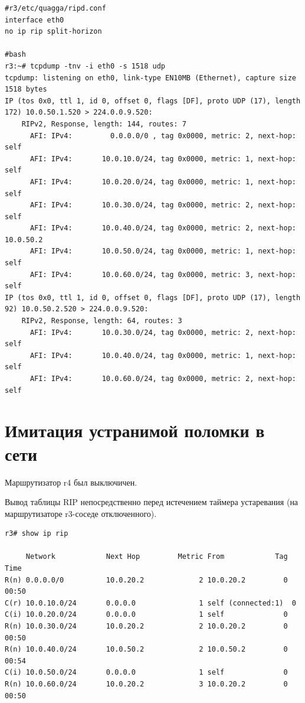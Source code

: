 \documentclass[a4paper,12pt]{article}
\begin{document}
\begin{Verbatim}
#r3/etc/quagga/ripd.conf
interface eth0
no ip rip split-horizon

#bash
r3:~# tcpdump -tnv -i eth0 -s 1518 udp
tcpdump: listening on eth0, link-type EN10MB (Ethernet), capture size 1518 bytes
IP (tos 0x0, ttl 1, id 0, offset 0, flags [DF], proto UDP (17), length 172) 10.0.50.1.520 > 224.0.0.9.520: 
	RIPv2, Response, length: 144, routes: 7
	  AFI: IPv4:         0.0.0.0/0 , tag 0x0000, metric: 2, next-hop: self
	  AFI: IPv4:       10.0.10.0/24, tag 0x0000, metric: 1, next-hop: self
	  AFI: IPv4:       10.0.20.0/24, tag 0x0000, metric: 1, next-hop: self
	  AFI: IPv4:       10.0.30.0/24, tag 0x0000, metric: 2, next-hop: self
	  AFI: IPv4:       10.0.40.0/24, tag 0x0000, metric: 2, next-hop: 10.0.50.2
	  AFI: IPv4:       10.0.50.0/24, tag 0x0000, metric: 1, next-hop: self
	  AFI: IPv4:       10.0.60.0/24, tag 0x0000, metric: 3, next-hop: self
IP (tos 0x0, ttl 1, id 0, offset 0, flags [DF], proto UDP (17), length 92) 10.0.50.2.520 > 224.0.0.9.520: 
	RIPv2, Response, length: 64, routes: 3
	  AFI: IPv4:       10.0.30.0/24, tag 0x0000, metric: 2, next-hop: self
	  AFI: IPv4:       10.0.40.0/24, tag 0x0000, metric: 1, next-hop: self
	  AFI: IPv4:       10.0.60.0/24, tag 0x0000, metric: 2, next-hop: self
\end{Verbatim}


\section{Имитация устранимой поломки в сети}

Маршрутизатор r4 был выключичен.

Вывод таблицы RIP непосредственно перед истечением таймера устаревания (на маршрутизаторе r3-соседе отключенного).

\begin{Verbatim}
r3# show ip rip

     Network            Next Hop         Metric From            Tag Time
R(n) 0.0.0.0/0          10.0.20.2             2 10.0.20.2         0 00:50
C(r) 10.0.10.0/24       0.0.0.0               1 self (connected:1)  0
C(i) 10.0.20.0/24       0.0.0.0               1 self              0
R(n) 10.0.30.0/24       10.0.20.2             2 10.0.20.2         0 00:50
R(n) 10.0.40.0/24       10.0.50.2             2 10.0.50.2         0 00:54
C(i) 10.0.50.0/24       0.0.0.0               1 self              0
R(n) 10.0.60.0/24       10.0.20.2             3 10.0.20.2         0 00:50

\end{Verbatim}
\end{document}
